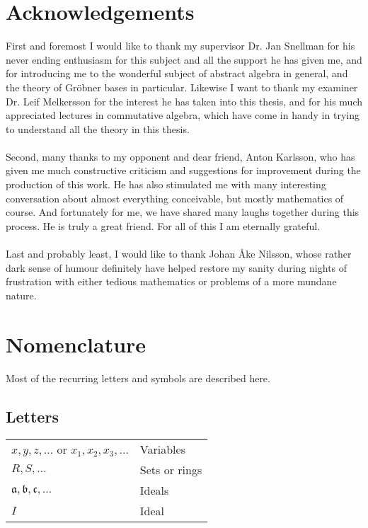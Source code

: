 \documentclass[english,bachelor]{liumaiex}
\begin{document}

\placekeywords
\placeurl

\chapter*{Acknowledgements}

First and foremost I would like to thank my supervisor Dr. Jan Snellman for his never ending enthusiasm for this subject and all the support he has given me, and for introducing me to the wonderful subject of abstract algebra in general, and the theory of Gröbner bases in particular. Likewise I want to thank my examiner Dr. Leif Melkersson for the interest he has taken into this thesis, and for his much appreciated lectures in commutative algebra, which have come in handy in trying to understand all the theory in this thesis.\\ \\
Second, many thanks to my opponent and dear friend, Anton Karlsson, who has given me much constructive criticism and suggestions for improvement during the production of this work. He has also stimulated me with many interesting conversation about almost everything conceivable, but mostly mathematics of course. And fortunately for me, we have shared many laughs together during this process. He is truly a great friend. For all of this I am eternally grateful.\\ \\
Last and probably least, I would like to thank Johan Åke Nilsson, whose rather dark sense of humour definitely have helped restore my sanity during nights of frustration with either tedious mathematics or problems of a more mundane nature.
\chapter*{Nomenclature}

Most of the recurring letters and symbols are described here.\\
\section*{Letters}
\begin{tabular}{l l}
$x,y,z,\dots$ or $x_1,x_2,x_3,\dots$ & Variables \\
$R,S,\dots$ & Sets or rings \\
$\mathfrak{a},\mathfrak{b},\mathfrak{c},\dots$ & Ideals \\
$I$ & Ideal
\end{tabular}
\end{document}
